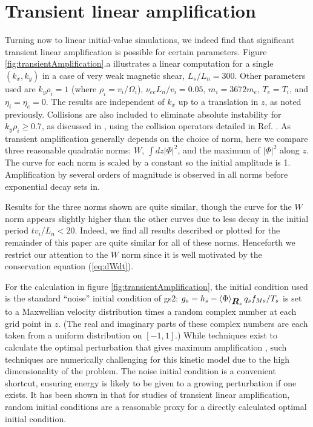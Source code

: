 \documentclass[12pt,superscriptaddress]{revtex4}
\newcommand{\vect}[1]{\mbox{\boldmath $#1$}}
\newcommand{\nuee}{\nu_{ee}}
\begin{document}
\section{Transient linear amplification}
\label{sec:transient}

Turning now to linear initial-value simulations,
we indeed find that significant transient linear amplification is possible for certain parameters.
Figure \ref{fig:transientAmplification}.a illustrates
a linear computation for a single $(k_x,k_y)$ in a case of very weak magnetic shear, $L_s / L_n = 300$.
Other parameters used are $k_y \rho_i = 1$ (where  $\rho_i = v_i / \Omega_i$), $\nuee L_n / v_i = 0.05$,
$m_i = 3672 m_e$,
$T_e = T_i$, and $\eta_i = \eta_e = 0$.
The results are independent of $k_x$ up to a translation in $z$, as noted previously.
Collisions are also included to eliminate absolute instability for $k_y \rho_i \ge 0.7$,
as discussed in \cite{usUniversalInstability},
using the collision operators detailed in Ref. \cite{Abel}.
As transient amplification generally depends on the choice
of norm, here we compare three reasonable quadratic norms: $W$, $\int dz |\Phi|^2$,
and the maximum of $|\Phi|^2$ along $z$.
The curve for each norm is scaled by a constant so the initial amplitude is 1.
Amplification by several orders of magnitude is observed in all norms
before exponential decay sets in.

Results for the three norms shown are quite similar,
though the curve for the $W$ norm appears slightly higher than the other curves
due to less decay in the initial period $t v_i / L_n <20$.
Indeed, we find
all results described or plotted for the remainder of this paper are quite similar
for all of these norms.
Henceforth we restrict our attention to the $W$ norm since it is well motivated
by the conservation equation (\ref{eq:dWdt}).

For the calculation in figure \ref{fig:transientAmplification}, the initial condition used
is the standard ``noise'' initial condition of gs2:
$g_s = h_s - \left< \Phi\right>_{\vect{R}_s} q_s f_{Ms} / T_s$ is set to a Maxwellian velocity distribution
times a random complex number at each grid point in $z$.
(The real and imaginary parts of these complex numbers are each taken from a uniform distribution on $[-1,1]$.)
While techniques exist to calculate the optimal perturbation
that gives maximum amplification \cite{FarrellIoannou, SquirePRL, SquireApJ}, such techniques
are numerically challenging for this kinetic model due to the high dimensionality
of the problem.
The noise initial condition is a convenient shortcut, ensuring energy is likely
to be given to a growing perturbation if one exists.
It has been shown in \cite{Camargo, SquireApJ} that for studies of transient linear
amplification, random initial conditions are a reasonable proxy
for a directly calculated optimal initial condition.
\end{document}
